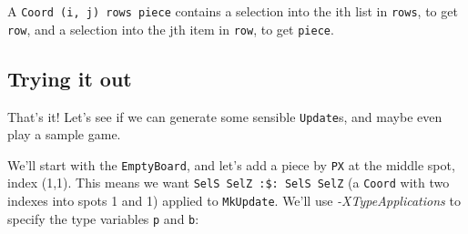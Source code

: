 \documentclass[]{article}
\newenvironment{Shaded}{}{}
\newcommand{\CommentTok}[1]{\textcolor[rgb]{0.38,0.63,0.69}{\textit{#1}}}
\newcommand{\DataTypeTok}[1]{\textcolor[rgb]{0.56,0.13,0.00}{#1}}
\newcommand{\FunctionTok}[1]{\textcolor[rgb]{0.02,0.16,0.49}{#1}}
\newcommand{\KeywordTok}[1]{\textcolor[rgb]{0.00,0.44,0.13}{\textbf{#1}}}
\newcommand{\NormalTok}[1]{#1}
\newcommand{\OtherTok}[1]{\textcolor[rgb]{0.00,0.44,0.13}{#1}}
\begin{document}
\begin{Shaded}
\end{Shaded}

A \texttt{Coord\ \textquotesingle{}(i,\ j)\ rows\ piece} contains a selection
into the ith list in \texttt{rows}, to get \texttt{row}, and a selection into
the jth item in \texttt{row}, to get \texttt{piece}.

\hypertarget{trying-it-out}{%
\subsection{Trying it out}\label{trying-it-out}}

That's it! Let's see if we can generate some sensible \texttt{Update}s, and
maybe even play a sample game.

We'll start with the \texttt{EmptyBoard}, and let's add a piece by \texttt{PX}
at the middle spot, index (1,1). This means we want
\texttt{SelS\ SelZ\ :\$:\ SelS\ SelZ} (a \texttt{Coord} with two indexes into
spots 1 and 1) applied to \texttt{MkUpdate}. We'll use \emph{-XTypeApplications}
to specify the type variables \texttt{p} and \texttt{b}:
\end{document}
